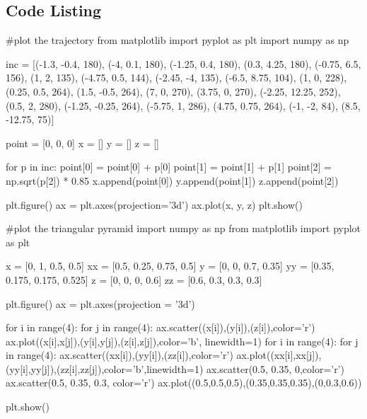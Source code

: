 \documentclass{article}
\begin{document}
\begin{appendices}
\section{Code Listing}
\begin{python}
#plot the trajectory
from matplotlib import pyplot as plt
import numpy as np

inc = [(-1.3, -0.4, 180),
(-4, 0.1, 180),
(-1.25, 0.4, 180),
(0.3, 4.25, 180),
(-0.75, 6.5, 156),
(1, 2, 135),
(-4.75, 0.5, 144),
(-2.45, -4, 135),
(-6.5, 8.75, 104),
(1, 0, 228),
(0.25, 0.5, 264),
(1.5, -0.5, 264),
(7, 0, 270),
(3.75, 0, 270),
(-2.25, 12.25, 252),
(0.5, 2, 280),
(-1.25, -0.25, 264),
(-5.75, 1, 286),
(4.75, 0.75, 264),
(-1, -2, 84),
(8.5, -12.75, 75)]

point = [0, 0, 0]
x = []
y = []
z = []

for p in inc:
    point[0] = point[0] + p[0]
    point[1] = point[1] + p[1]
    point[2] = np.sqrt(p[2]) * 0.85
    x.append(point[0])
    y.append(point[1])
    z.append(point[2])

plt.figure()
ax = plt.axes(projection='3d')
ax.plot(x, y, z)
plt.show()
\end{python}
\begin{python}
#plot the triangular pyramid
import numpy as np
from matplotlib import pyplot as plt

x = [0, 1, 0.5, 0.5]
xx = [0.5, 0.25, 0.75, 0.5]
y = [0, 0, 0.7, 0.35]
yy = [0.35, 0.175, 0.175, 0.525]
z = [0, 0, 0, 0.6]
zz = [0.6, 0.3, 0.3, 0.3]

plt.figure()
ax = plt.axes(projection = '3d')

for i in range(4):
    for j in range(4):
        ax.scatter((x[i]),(y[i]),(z[i]),color='r')
        ax.plot((x[i],x[j]),(y[i],y[j]),(z[i],z[j]),color='b', linewidth=1)
for i in range(4):
    for j in range(4):
        ax.scatter((xx[i]),(yy[i]),(zz[i]),color='r')
        ax.plot((xx[i],xx[j]),(yy[i],yy[j]),(zz[i],zz[j]),color='b',linewidth=1)
ax.scatter(0.5, 0.35, 0,color='r')
ax.scatter(0.5, 0.35, 0.3, color='r')
ax.plot((0.5,0.5,0.5),(0.35,0.35,0.35),(0,0.3,0.6))

plt.show()
\end{python}

\end{appendices}
\end{document}
